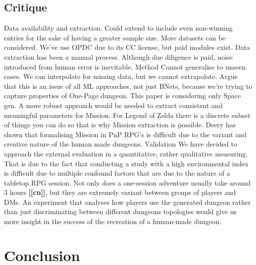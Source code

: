 \documentclass{UoYCSproject}
\begin{document}
\section{Critique}
\begin{outline}[enumerate]
  \1 Data
    \2 availability and extraction. 
      \3 Could extend to include even non-winning entries for the sake of having a greater sample size. More datasets can be considered. We've use OPDC due to its CC license, but paid modules exist.
      \3 Data extraction has been a manual process. Although due diligence is paid, noise introduced from human error is inevitable. 
  \1 Method
    \2 Cannot generalise to unseen cases. We can interpolate for missing data, but we cannot extrapolate. Argue that this is an issue of all ML approaches, not just BNets, because we're trying to capture properties of One-Page dungeon.
    \2 This paper is considering only Space gen. A more robust approach would be needed to extract consistent and meaningful parameters for Mission. For Legend of Zelda there is a discrete subset of things you can do so that is why Mission extraction is possible. Deery has shown that formalising Mission in PnP RPG's is difficult due to the variant and creative nature of the human made dungeons.
  \1 Validation
    \2 We have decided to approach the external evaluation in a quantitative, rather qualitative measuring. That is due to the fact that conducting a study with a high environmental index is difficult due to multiple confound factors that are due to the nature of a tabletop RPG session. Not only does a one-session adventure usually take around 3 hours \textbf{[[cn]]}, but they are extremely variant between groups of players and DMs. An experiment that analyses how players use the generated dungeon rather than just discriminating between different dungeons topologies would give us more insight in the success of the recreation of a human-made dungeon.
  
\end{outline}



\chapter{Conclusion}
\label{cha:conclusion}
\end{document}
